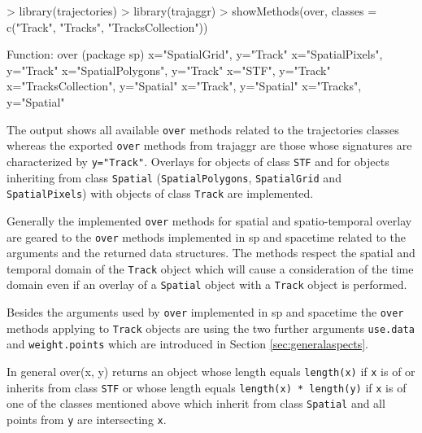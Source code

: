 \documentclass[12pt, oneside, a4paper]{scrbook}
\newcommand{\pkg}[1]{{\normalfont\fontseries{b}\selectfont #1}}
\let\code=\texttt
\begin{document}
\begin{small}
\begin{Schunk}
\begin{Sinput}
> library(trajectories)
> library(trajaggr)
> showMethods(over, classes = c("Track", "Tracks", "TracksCollection"))
\end{Sinput}
\begin{Soutput}
Function: over (package sp)
x="SpatialGrid", y="Track"
x="SpatialPixels", y="Track"
x="SpatialPolygons", y="Track"
x="STF", y="Track"
x="TracksCollection", y="Spatial"
x="Track", y="Spatial"
x="Tracks", y="Spatial"
\end{Soutput}
\end{Schunk}
\end{small}

The output shows all available \code{over} methods related to the \pkg{trajectories} classes whereas the exported \code{over} methods from \pkg{trajaggr} are those whose signatures are characterized by \code{y="Track"}. 
Overlays for objects of class \code{STF} and for objects inheriting from class \code{Spatial} (\code{SpatialPolygons}, \code{SpatialGrid} and \code{SpatialPixels}) with objects of class \code{Track} are implemented.
\par\medskip

Generally the implemented \code{over} methods for spatial and spatio-temporal overlay are geared to the \code{over} methods implemented in \pkg{sp} and \pkg{spacetime} related to the arguments and the returned data structures. 
The methods respect the spatial and temporal domain of the \code{Track} object which will cause a consideration of the time domain even if an overlay of a \code{Spatial} object with a \code{Track} object is performed. 
\par\medskip

Besides the arguments used by \code{over} implemented in \pkg{sp} and \pkg{spacetime} the \code{over} methods applying to \code{Track} objects 
are using the two further arguments \code{use.data} and \code{weight.points} which are introduced in Section \ref{sec:generalaspects}.
\par\medskip


In general over(x, y) returns an object whose length equals \code{length(x)} if \code{x} is of or inherits from class \code{STF} or whose length equals \code{length(x) * length(y)} if \code{x} is of one of the classes mentioned above which inherit from class \code{Spatial} and all points from \code{y} are intersecting \code{x}.
\par\medskip
\end{document}
